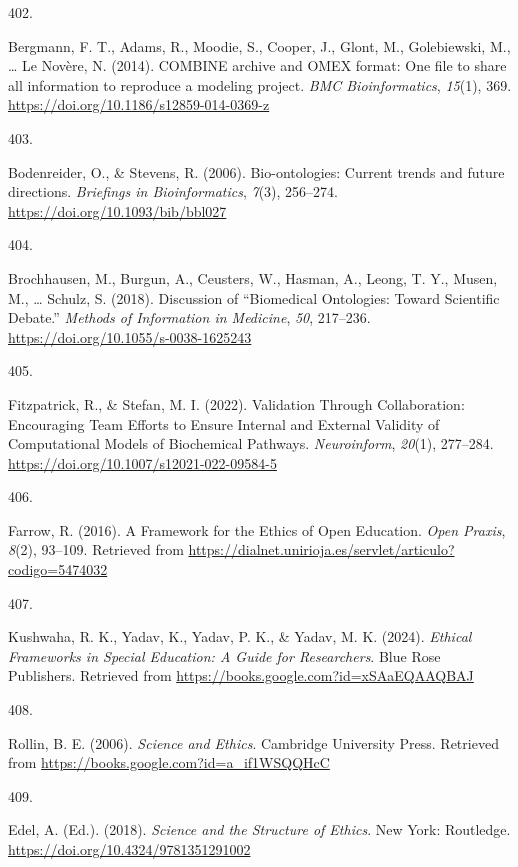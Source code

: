 \documentclass[
  11pt,
  letterpaper,
]{scrreprt}
\newlength{\cslhangindent}
\newlength{\csllabelwidth}
\newenvironment{CSLReferences}[2] %
 {\begin{list}{}{%
  \setlength{\itemindent}{0pt}
  \setlength{\leftmargin}{0pt}
  \setlength{\parsep}{0pt}
  \ifodd #1
   \setlength{\leftmargin}{\cslhangindent}
   \setlength{\itemindent}{-1\cslhangindent}
  \fi
  \setlength{\itemsep}{#2\baselineskip}}}
 {\end{list}}
\newcommand{\CSLLeftMargin}[1]{\parbox[t]{\csllabelwidth}{\strut#1\strut}}
\newcommand{\CSLRightInline}[1]{\parbox[t]{\linewidth - \csllabelwidth}{\strut#1\strut}}
\begin{document}
\begin{CSLReferences}{0}{0}
\CSLLeftMargin{402. }%
\CSLRightInline{Bergmann, F. T., Adams, R., Moodie, S., Cooper, J.,
Glont, M., Golebiewski, M., \ldots{} Le Novère, N. (2014). {COMBINE}
archive and {OMEX} format: One file to share all information to
reproduce a modeling project. \emph{BMC Bioinformatics}, \emph{15}(1),
369. \url{https://doi.org/10.1186/s12859-014-0369-z}}

\CSLLeftMargin{403. }%
\CSLRightInline{Bodenreider, O., \& Stevens, R. (2006). Bio-ontologies:
Current trends and future directions. \emph{Briefings in
Bioinformatics}, \emph{7}(3), 256--274.
\url{https://doi.org/10.1093/bib/bbl027}}

\CSLLeftMargin{404. }%
\CSLRightInline{Brochhausen, M., Burgun, A., Ceusters, W., Hasman, A.,
Leong, T. Y., Musen, M., \ldots{} Schulz, S. (2018). Discussion of
{``{Biomedical Ontologies}: {Toward Scientific Debate}.''} \emph{Methods
of Information in Medicine}, \emph{50}, 217--236.
\url{https://doi.org/10.1055/s-0038-1625243}}

\CSLLeftMargin{405. }%
\CSLRightInline{Fitzpatrick, R., \& Stefan, M. I. (2022). Validation
{Through Collaboration}: {Encouraging Team Efforts} to {Ensure Internal}
and {External Validity} of {Computational Models} of {Biochemical
Pathways}. \emph{Neuroinform}, \emph{20}(1), 277--284.
\url{https://doi.org/10.1007/s12021-022-09584-5}}

\CSLLeftMargin{406. }%
\CSLRightInline{Farrow, R. (2016). A {Framework} for the {Ethics} of
{Open Education}. \emph{Open Praxis}, \emph{8}(2), 93--109. Retrieved
from \url{https://dialnet.unirioja.es/servlet/articulo?codigo=5474032}}

\CSLLeftMargin{407. }%
\CSLRightInline{Kushwaha, R. K., Yadav, K., Yadav, P. K., \& Yadav, M.
K. (2024). \emph{Ethical {Frameworks} in {Special Education}: {A Guide}
for {Researchers}}. Blue Rose Publishers. Retrieved from
\url{https://books.google.com?id=xSAaEQAAQBAJ}}

\CSLLeftMargin{408. }%
\CSLRightInline{Rollin, B. E. (2006). \emph{Science and {Ethics}}.
Cambridge University Press. Retrieved from
\url{https://books.google.com?id=a_if1WSQQHcC}}

\CSLLeftMargin{409. }%
\CSLRightInline{Edel, A. (Ed.). (2018). \emph{Science and the
{Structure} of {Ethics}}. New York: Routledge.
\url{https://doi.org/10.4324/9781351291002}}


\end{CSLReferences}
\end{document}
